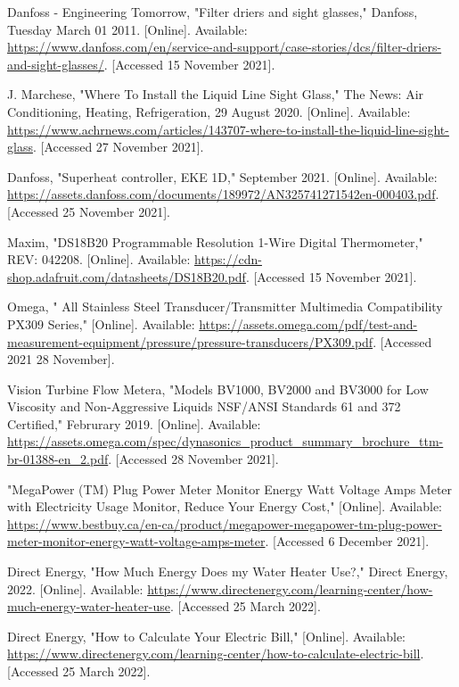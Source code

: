 \documentclass{ucalgarythesis}
\begin{document}
\begin{thebibliography}{9}
     Danfoss - Engineering Tomorrow, "Filter driers and sight glasses," Danfoss, Tuesday March 01 2011. [Online]. Available: \url{https://www.danfoss.com/en/service-and-support/case-stories/dcs/filter-driers-and-sight-glasses/}. [Accessed 15 November 2021].
    
     J. Marchese, "Where To Install the Liquid Line Sight Glass," The News: Air Conditioning, Heating, Refrigeration, 29 August 2020. [Online]. Available: \url{https://www.achrnews.com/articles/143707-where-to-install-the-liquid-line-sight-glass}. [Accessed 27 November 2021].
    
     Danfoss, "Superheat controller, EKE 1D," September 2021. [Online]. Available: \url{https://assets.danfoss.com/documents/189972/AN325741271542en-000403.pdf}. [Accessed 25 November 2021].
    
     Maxim, "DS18B20 Programmable Resolution 1-Wire Digital Thermometer," REV: 042208. [Online]. Available: \url{https://cdn-shop.adafruit.com/datasheets/DS18B20.pdf}. [Accessed 15 November 2021].
    
     Omega, " All Stainless Steel Transducer/Transmitter Multimedia Compatibility PX309 Series," [Online]. Available: \url{https://assets.omega.com/pdf/test-and-measurement-equipment/pressure/pressure-transducers/PX309.pdf}. [Accessed 2021 28 November].
    
     Vision Turbine Flow Metera, "Models BV1000, BV2000 and BV3000 for Low Viscosity and Non-Aggressive Liquids NSF/ANSI Standards 61 and 372 Certified," Februrary 2019. [Online]. Available: \url{https://assets.omega.com/spec/dynasonics_product_summary_brochure_ttm-br-01388-en_2.pdf}. [Accessed 28 November 2021].
    
     "MegaPower (TM) Plug Power Meter Monitor Energy Watt Voltage Amps Meter with Electricity Usage Monitor, Reduce Your Energy Cost," [Online]. Available: \url{https://www.bestbuy.ca/en-ca/product/megapower-megapower-tm-plug-power-meter-monitor-energy-watt-voltage-amps-meter}. [Accessed 6 December 2021].
    
     Direct Energy, "How Much Energy Does my Water Heater Use?," Direct Energy, 2022. [Online]. Available: \url {https://www.directenergy.com/learning-center/how-much-energy-water-heater-use}. [Accessed 25 March 2022].
    
     Direct Energy, "How to Calculate Your Electric Bill," [Online]. Available: \url{https://www.directenergy.com/learning-center/how-to-calculate-electric-bill}. [Accessed 25 March 2022].
    

\end{thebibliography}
\end{document}
